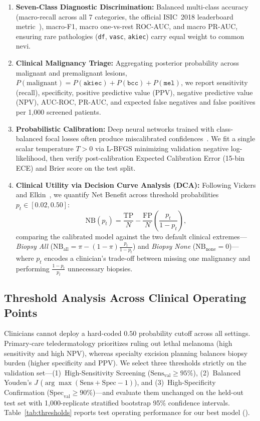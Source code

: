 \begin{enumerate}
  \item \textbf{Seven-Class Diagnostic Discrimination:} Balanced multi-class accuracy (macro-recall across all 7 categories, the official ISIC~2018 leaderboard metric~\cite{Codella2019skin}), macro-F1, macro one-vs-rest ROC-AUC, and macro PR-AUC, ensuring rare pathologies (\texttt{df}, \texttt{vasc}, \texttt{akiec}) carry equal weight to common nevi.
  \item \textbf{Clinical Malignancy Triage:} Aggregating posterior probability across malignant and premalignant lesions, $P(\text{malignant}) = P(\texttt{akiec}) + P(\texttt{bcc}) + P(\texttt{mel})$, we report sensitivity (recall), specificity, positive predictive value (PPV), negative predictive value (NPV), AUC-ROC, PR-AUC, and expected false negatives and false positives per 1,000 screened patients.
  \item \textbf{Probabilistic Calibration:} Deep neural networks trained with class-balanced focal losses often produce miscalibrated confidences~\cite{Guo2017calibration}. We fit a single scalar temperature $T > 0$ via L-BFGS minimizing validation negative log-likelihood, then verify post-calibration Expected Calibration Error (15-bin ECE) and Brier score on the test split.
  \item \textbf{Clinical Utility via Decision Curve Analysis (DCA):} Following Vickers and Elkin~\cite{Vickers2006decision}, we quantify Net Benefit across threshold probabilities $p_t \in [0.02, 0.50]$:
  \begin{equation}
    \mathrm{NB}(p_t) = \frac{\mathrm{TP}}{N} - \frac{\mathrm{FP}}{N}\left(\frac{p_t}{1 - p_t}\right),
  \end{equation}
  comparing the calibrated model against the two default clinical extremes—\emph{Biopsy All} ($\mathrm{NB}_{\text{all}} = \pi - (1-\pi)\frac{p_t}{1-p_t}$) and \emph{Biopsy None} ($\mathrm{NB}_{\text{none}} = 0$)—where $p_t$ encodes a clinician's trade-off between missing one malignancy and performing $\frac{1-p_t}{p_t}$ unnecessary biopsies.
\end{enumerate}

\subsection{Threshold Analysis Across Clinical Operating Points}
Clinicians cannot deploy a hard-coded $0.50$ probability cutoff across all settings. Primary-care teledermatology prioritizes ruling out lethal melanoma (high sensitivity and high NPV), whereas specialty excision planning balances biopsy burden (higher specificity and PPV). We select three thresholds strictly on the validation set—(1)~High-Sensitivity Screening ($\text{Sens}_{\text{val}} \ge 95\%$), (2)~Balanced Youden's $J$ ($\arg\max(\text{Sens}+\text{Spec}-1)$), and (3)~High-Specificity Confirmation ($\text{Spec}_{\text{val}} \ge 90\%$)—and evaluate them unchanged on the held-out test set with 1,000-replicate stratified bootstrap 95\% confidence intervals. Table~\ref{tab:thresholds} reports test operating performance for our best model (\WSixBestModel{}).

